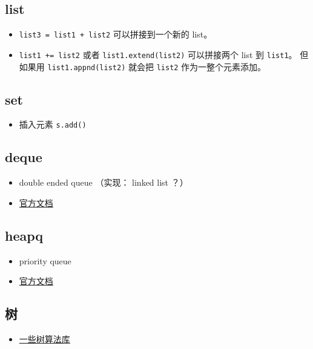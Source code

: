 
\begin{issues}
\issueDraft
\end{issues}

\subsection{list}
\begin{itemize}
\item \verb`list3 = list1 + list2` 可以拼接到一个新的 list。
\item \verb`list1 += list2` 或者 \verb`list1.extend(list2)` 可以拼接两个 list 到 \verb`list1`。 但如果用 \verb`list1.appnd(list2)` 就会把 \verb`list2` 作为一整个元素添加。
\end{itemize}

\subsection{set}
\begin{itemize}
\item 插入元素 \verb`s.add()`
\end{itemize}

\subsection{deque}
\begin{itemize}
\item double ended queue （实现： linked list ？）
\item \href{https://docs.python.org/3/library/collections.html}{官方文档}
\end{itemize}

\subsection{heapq}
\begin{itemize}
\item priority queue
\item \href{https://docs.python.org/3/library/heapq.html}{官方文档}
\end{itemize}

\subsection{树}
\begin{itemize}
\item \href{https://stackoverflow.com/questions/2442014/tree-libraries-in-python}{一些树算法库}
\end{itemize}


